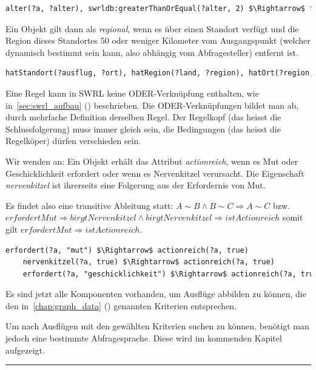 \begin{lstlisting}[caption={Beispiel der SWRL-Regel für die Eigenschaft \textit{familienfreundlich}},captionpos=b,language=XML]
    alter(?a, ?alter), swrldb:greaterThanOrEqual(?alter, 2) $\Rightarrow$ familienfreundlich(?a, true)
\end{lstlisting}

Ein Objekt gilt dann als \textit{regional}, wenn es über einen Standort verfügt und die Region dieses Standortes 50 oder weniger Kilometer vom Ausgangspunkt (welcher dynamisch bestimmt sein kann, also abhängig vom Abfragesteller) entfernt ist.

\begin{lstlisting}[caption={Beispiel der SWRL-Regel für die Eigenschaft \textit{regional}},captionpos=b,language=xml]
    hatStandort(?ausflug, ?ort), hatRegion(?land, ?region), hatOrt(?region, ?ort), distanzZuAusgangspunkt(?region, ?distanz), swrldb:lessThanOrEqual(?distanz, 50) $\Rightarrow$ regional(?ausflug, true)
\end{lstlisting}

Eine Regel kann in SWRL keine ODER-Verknüpfung enthalten, wie in~\autoref{sec:swrl_aufbau} () beschrieben. Die ODER-Verknüpfungen bildet man ab, durch mehrfache Definition derselben Regel. Der Regelkopf (das heisst die Schlussfolgerung) muss immer gleich sein, die Bedingungen (das heisst die Regelköper) dürfen verschieden sein.

Wir wenden an: Ein Objekt erhält das Attribut \textit{actionreich}, wenn es Mut oder Geschicklichkeit erfordert oder wenn es Nervenkitzel verursacht. Die Eigenschaft \textit{nervenkitzel} ist ihrerseits eine Folgerung aus der Erfordernis von Mut.

Es findet also eine transitive Ableitung statt: $A \sim B \wedge B \sim C \Rightarrow A \sim C$ bzw. $erfordertMut \Rightarrow birgtNervenkitzel \wedge birgtNervenkitzel \Rightarrow istActionreich$ somit gilt $erfordertMut \Rightarrow istActionreich$.

\begin{lstlisting}[caption={Beispiel der SWRL-Regel für die Eigenschaft \textit{actionreich}},captionpos=b,language=XML]
    erfordert(?a, "mut") $\Rightarrow$ actionreich(?a, true)
    nervenkitzel(?a, true) $\Rightarrow$ actionreich(?a, true)
    erfordert(?a, "geschicklichkeit") $\Rightarrow$ actionreich(?a, true)
\end{lstlisting}

Es sind jetzt alle Komponenten vorhanden, um Ausflüge abbilden zu können, die den in~\autoref{chap:graph_data} () genannten Kriterien entsprechen.

Um nach Ausflügen mit den gewählten Kriterien suchen zu können, benötigt man jedoch eine bestimmte Abfragesprache. Diese wird im kommenden Kapitel aufgezeigt.

\noindent\rule[1ex]{\textwidth}{1pt}
